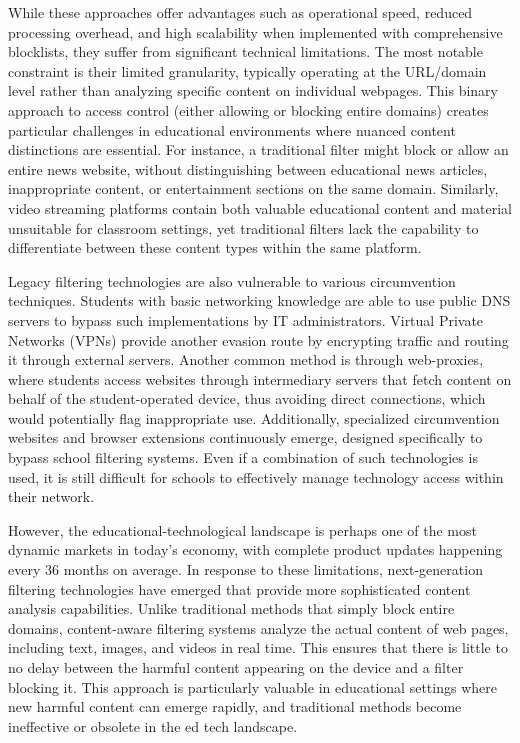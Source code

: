\documentclass[
  titlepage]{article}
\begin{document}
While these approaches offer advantages such as operational speed,
reduced processing overhead, and high scalability when implemented with
comprehensive blocklists, they suffer from significant technical
limitations. The most notable constraint is their limited granularity,
typically operating at the URL/domain level rather than analyzing
specific content on individual webpages. This binary approach to access
control (either allowing or blocking entire domains) creates particular
challenges in educational environments where nuanced content
distinctions are essential. For instance, a traditional filter might
block or allow an entire news website, without distinguishing between
educational news articles, inappropriate content, or entertainment
sections on the same domain. Similarly, video streaming platforms
contain both valuable educational content and material unsuitable for
classroom settings, yet traditional filters lack the capability to
differentiate between these content types within the same platform.

Legacy filtering technologies are also vulnerable to various
circumvention techniques. Students with basic networking knowledge are
able to use public DNS servers to bypass such implementations by IT
administrators. Virtual Private Networks (VPNs) provide another evasion
route by encrypting traffic and routing it through external servers.
Another common method is through web-proxies, where students access
websites through intermediary servers that fetch content on behalf of
the student-operated device, thus avoiding direct connections, which
would potentially flag inappropriate use. Additionally, specialized
circumvention websites and browser extensions continuously emerge,
designed specifically to bypass school filtering systems. Even if a
combination of such technologies is used, it is still difficult for
schools to effectively manage technology access within their network.

However, the educational-technological landscape is perhaps one of the
most dynamic markets in today's economy, with complete product updates
happening every 36 months on average. In response to these limitations,
next-generation filtering technologies have emerged that provide more
sophisticated content analysis capabilities. Unlike traditional methods
that simply block entire domains, content-aware filtering systems
analyze the actual content of web pages, including text, images, and
videos in real time. This ensures that there is little to no delay
between the harmful content appearing on the device and a filter
blocking it. This approach is particularly valuable in educational
settings where new harmful content can emerge rapidly, and traditional
methods become ineffective or obsolete in the ed tech landscape.
\end{document}
